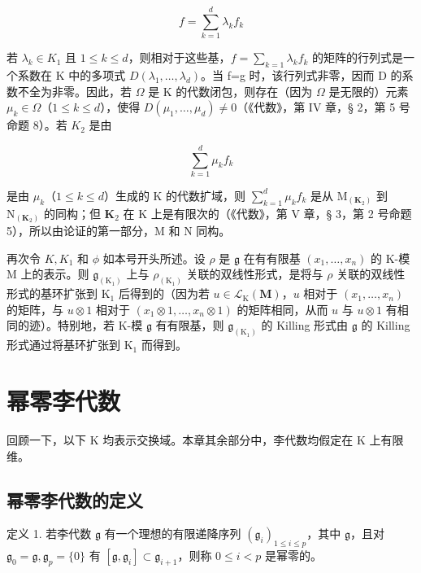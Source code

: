 \[
f = \sum_ {k = 1} ^ {d} \lambda_ {k} f _ {k}
\]

若 \(\lambda_{k}\in K_{1}\) 且 \(1\leqslant k\leqslant d\)，则相对于这些基，\(f=\sum_{k=1}\lambda_{k}f_{k}\) 的矩阵的行列式是一个系数在 K 中的多项式 \(D(\lambda_{1},\ldots,\lambda_{d})\)。当 f=g 时，该行列式非零，因而 D 的系数不全为非零。因此，若 \(\Omega\) 是 K 的代数闭包，则存在（因为 \(\Omega\) 是无限的）元素 \(\mu_{k}\in\Omega\)（\(1\leqslant k\leqslant d\)），使得 \(D(\mu_{1},\ldots,\mu_{d})\neq0\)（《代数》，第 IV 章，§ 2，第 5 号命题 8）。若 \(K_{2}\) 是由

\[
\sum_ {k = 1} ^ {d} \mu_ {k} f _ {k}
\]

是由 \(\mu_{k}\)（\(1 \leqslant k \leqslant d\)）生成的 K 的代数扩域，则 \(\sum_{k=1}^{d} \mu_{k} f_{k}\) 是从 \(\mathrm{M}_{(\mathbf{K}_{2})}\) 到 \(\mathrm{N}_{(\mathbf{K}_{2})}\) 的同构；但 \(\mathbf{K}_{2}\) 在 K 上是有限次的（《代数》，第 V 章，§ 3，第 2 号命题 5），所以由论证的第一部分，M 和 N 同构。

再次令 \(K, K_{1}\) 和 \(\phi\) 如本号开头所述。设 \(\rho\) 是 \(\mathfrak{g}\) 在有有限基 \((x_{1},\ldots ,x_{n})\) 的 K-模 M 上的表示。则 \(\mathfrak{g}_{(\mathrm{K}_1)}\) 上与 \(\rho_{(\mathrm{K}_1)}\) 关联的双线性形式，是将与 \(\rho\) 关联的双线性形式的基环扩张到 \(\mathrm{K}_1\) 后得到的（因为若 \(u\in \mathcal{L}_{\mathrm{K}}(\mathbf{M})\)，\(u\) 相对于 \((x_{1},\dots,x_{n})\) 的矩阵，与 \(u\otimes 1\) 相对于 \((x_{1}\otimes 1,\dots,x_{n}\otimes 1)\) 的矩阵相同，从而 \(u\) 与 \(u\otimes 1\) 有相同的迹）。特别地，若 K-模 \(\mathfrak{g}\) 有有限基，则 \(\mathfrak{g}_{(\mathrm{K}_1)}\) 的 Killing 形式由 \(\mathfrak{g}\) 的 Killing 形式通过将基环扩张到 \(\mathrm{K}_1\) 而得到。

\section{幂零李代数}

回顾一下，以下 K 均表示交换域。本章其余部分中，李代数均假定在 K 上有限维。

\subsection{幂零李代数的定义}

定义 1. 若李代数 \(\mathfrak{g}\) 有一个理想的有限递降序列 \((\mathfrak{g}_i)_{1\leqslant i\leqslant p}\)，其中 \(\mathfrak{g}\)，且对 \(\mathfrak{g}_0 = \mathfrak{g},\mathfrak{g}_p = \{0\}\) 有 \([\mathfrak{g},\mathfrak{g}_i]\subset \mathfrak{g}_{i + 1}\)，则称 \(0\leqslant i < p\) 是幂零的。

